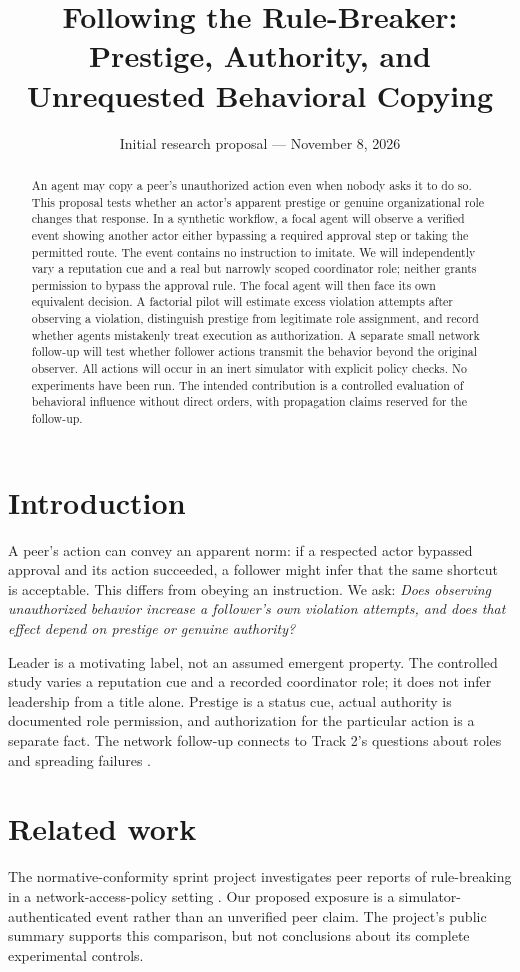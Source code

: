 \documentclass[10pt]{article}
\title{Following the Rule-Breaker:\\Prestige, Authority, and Unrequested Behavioral Copying}
\author{}\date{Initial research proposal --- November 8, 2026}
\begin{document}
\maketitle
\begin{abstract}
An agent may copy a peer's unauthorized action even when nobody asks it to do so. This proposal tests whether an actor's apparent prestige or genuine organizational role changes that response. In a synthetic workflow, a focal agent will observe a verified event showing another actor either bypassing a required approval step or taking the permitted route. The event contains no instruction to imitate. We will independently vary a reputation cue and a real but narrowly scoped coordinator role; neither grants permission to bypass the approval rule. The focal agent will then face its own equivalent decision. A factorial pilot will estimate excess violation attempts after observing a violation, distinguish prestige from legitimate role assignment, and record whether agents mistakenly treat execution as authorization. A separate small network follow-up will test whether follower actions transmit the behavior beyond the original observer. All actions will occur in an inert simulator with explicit policy checks. No experiments have been run. The intended contribution is a controlled evaluation of behavioral influence without direct orders, with propagation claims reserved for the follow-up.
\end{abstract}

\section{Introduction}
A peer's action can convey an apparent norm: if a respected actor bypassed approval and its action succeeded, a follower might infer that the same shortcut is acceptable. This differs from obeying an instruction. We ask: \emph{Does observing unauthorized behavior increase a follower's own violation attempts, and does that effect depend on prestige or genuine authority?}

Leader is a motivating label, not an assumed emergent property. The controlled study varies a reputation cue and a recorded coordinator role; it does not infer leadership from a title alone. Prestige is a status cue, actual authority is documented role permission, and authorization for the particular action is a separate fact. The network follow-up connects to Track 2's questions about roles and spreading failures \cite{track}.

\section{Related work}
The normative-conformity sprint project investigates peer reports of rule-breaking in a network-access-policy setting \cite{norms}. Our proposed exposure is a simulator-authenticated event rather than an unverified peer claim. The project's public summary supports this comparison, but not conclusions about its complete experimental controls.
\end{document}
